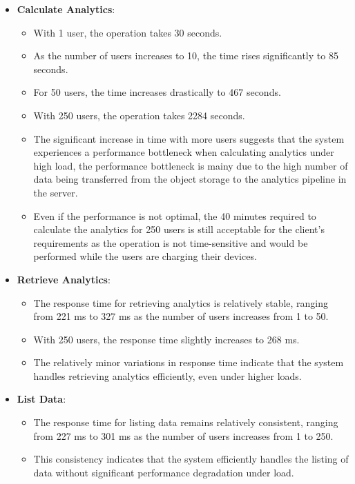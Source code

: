 \begin{itemize}
\item \textbf{Calculate Analytics}:
    \begin{itemize}
    \item With 1 user, the operation takes 30 seconds.
    \item As the number of users increases to 10, the time rises significantly to 85 seconds.
    \item For 50 users, the time increases drastically to 467 seconds.
    \item With 250 users, the operation takes 2284 seconds.
    \item The significant increase in time with more users suggests that the system experiences a performance bottleneck when calculating analytics under high load, the performance bottleneck is mainy due to the high number of data being transferred from the object storage to the analytics pipeline in the server.
    \item Even if the performance is not optimal, the 40 minutes required to calculate the analytics for 250 users is still acceptable for the client's requirements as the operation is not time-sensitive and would be performed while the users are charging their devices.
    \end{itemize}

\item \textbf{Retrieve Analytics}:
    \begin{itemize}
        \item The response time for retrieving analytics is relatively stable, ranging from 221 ms to 327 ms as the number of users increases from 1 to 50.
        \item With 250 users, the response time slightly increases to 268 ms.
        \item The relatively minor variations in response time indicate that the system handles retrieving analytics efficiently, even under higher loads.
    \end{itemize}

\item \textbf{List Data}:
    \begin{itemize}
        \item The response time for listing data remains relatively consistent, ranging from 227 ms to 301 ms as the number of users increases from 1 to 250.
        \item This consistency indicates that the system efficiently handles the listing of data without significant performance degradation under load.
    \end{itemize}
\end{itemize}

